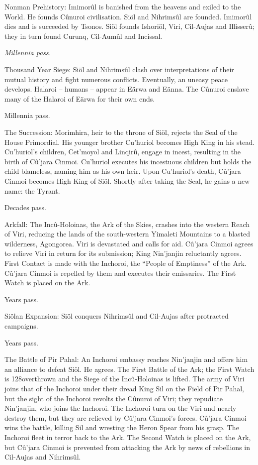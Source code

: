 \documentclass[]{book}
\begin{document}
Nonman Prehistory: Imimorûl is banished from the heavens and exiled to the World.
He founds Cûnuroi civilisation. Siöl and Nihrimsûl are founded. Imimorûl dies and is
succeeded by Tsonos. Siöl founds Ishoriöl, Viri, Cil-Aujas and Illisserû; they in turn
found Curunq, Cil-Aumûl and Incissal.

\emph{Millennia pass.}

Thousand Year Siege: Siöl and Nihrimsûl clash over interpretations of their mutual
history and fight numerous conflicts. Eventually, an uneasy peace develops. Halaroi --
humans -- appear in Eärwa and Eänna. The Cûnuroi enslave many of the Halaroi of
Eärwa for their own ends.

Millennia pass.

The Succession: Morimhira, heir to the throne of Siöl, rejects the Seal of the House
Primordial. His younger brother Cu'huriol becomes High King in his stead. Cu'huriol's
children, Cet'moyol and Linqirû, engage in incest, resulting in the birth of Cû'jara
Cinmoi. Cu'huriol executes his incestuous children but holds the child blameless,
naming him as his own heir. Upon Cu'huriol's death, Cû'jara Cinmoi becomes High
King of Siöl. Shortly after taking the Seal, he gains a new name: the Tyrant.

Decades pass.

Arkfall: The Incû-Holoinas, the Ark of the Skies, crashes into the western Reach of
Viri, reducing the lands of the south-western Yimaleti Mountains to a blasted
wilderness, Agongorea. Viri is devastated and calls for aid. Cû'jara Cinmoi agrees to
relieve Viri in return for its submission; King Nin'janjin reluctantly agrees. First
Contact is made with the Inchoroi, the ``People of Emptiness'' of the Ark. Cû'jara
Cinmoi is repelled by them and executes their emissaries. The First Watch is placed on
the Ark.

Years pass.

Siölan Expansion: Siöl conquers Nihrimsûl and Cil-Aujas after protracted campaigns.

Years pass.

The Battle of Pir Pahal: An Inchoroi embassy reaches Nin'janjin and offers him an
alliance to defeat Siöl. He agrees. The First Battle of the Ark; the First Watch is
128overthrown and the Siege of the Incû-Holoinas is lifted. The army of Viri joins that of
the Inchoroi under their dread King Sil on the Field of Pir Pahal, but the sight of the
Inchoroi revolts the Cûnuroi of Viri; they repudiate Nin'janjin, who joins the Inchoroi.
The Inchoroi turn on the Viri and nearly destroy them, but they are relieved by Cû'jara
Cinmoi's forces. Cû'jara Cinmoi wins the battle, killing Sil and wresting the Heron
Spear from his grasp. The Inchoroi fleet in terror back to the Ark. The Second Watch
is placed on the Ark, but Cû'jara Cinmoi is prevented from attacking the Ark by news
of rebellions in Cil-Aujas and Nihrimsûl.
\end{document}
